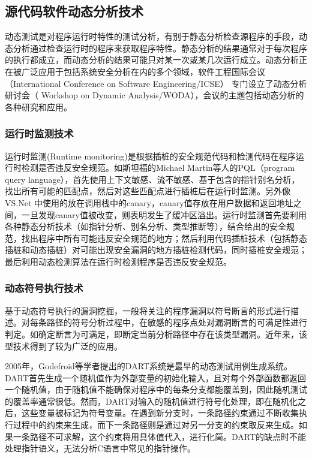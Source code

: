 \subsection{源代码软件动态分析技术}

动态测试是对程序运行时特性的测试分析，有别于静态分析检查源程序的手段，动态分析通过检查运行时的程序来获取程序特性。静态分析的结果通常对于每次程序的执行都成立，而动态分析的结果可能只对某一次或某几次运行成立。动态分析正在被广泛应用于包括系统安全分析在内的多个领域，软件工程国际会议（International Conference on Software Engineering/ICSE） 专门设立了动态分析研讨会（ Workshop on Dynamic Analysis/WODA），会议的主题包括动态分析的各种研究和应用。

\subsubsection{运行时监测技术}

运行时监测(Runtime monitoring)是根据插桩的安全规范代码和检测代码在程序运行时检测是否违反安全规范。如斯坦福的Michael Martin等人的PQL（program query language），首先使用上下文敏感、流不敏感、基于包含的指针别名分析，找出所有可能的匹配点，然后对这些匹配点进行插桩后在运行时监测。另外像VS.Net 中使用的放在调用栈中的canary，canary值存放在用户数据和返回地址之间，一旦发现canary值被改变，则表明发生了缓冲区溢出。运行时监测首先要利用各种静态分析技术（如指针分析、别名分析、类型推断等），结合给出的安全规范，找出程序中所有可能违反安全规范的地方；然后利用代码插桩技术（包括静态插桩和动态插桩）对可能出现安全漏洞的地方插桩检测代码，同时插桩安全规范；最后利用动态检测算法在运行时检测程序是否违反安全规范。

\subsubsection{动态符号执行技术}


基于动态符号执行的漏洞挖掘，一般将关注的程序漏洞以符号断言的形式进行描述。对每条路径的符号分析过程中，在敏感的程序点处对漏洞断言的可满足性进行判定。如确定断言为可满足，即断定当前分析路径中存在该类型漏洞。近年来，该型技术得到了较为广泛的应用。

2005年，Godefroid等学者提出的DART系统是最早的动态测试用例生成系统。DART首先生成一个随机值作为外部变量的初始化输入，且对每个外部函数都返回一个随机值，由于随机值不能确保对程序中的每条分支都能覆盖到，因此随机测试的覆盖率通常很低。然而，DART对输入的随机值进行符号化处理，即在随机化之后，这些变量被标记为符号变量。在遇到新分支时，一条路径约束通过不断收集执行过程中的约束来生成，而下一条路径则是通过对另一分支的约束取反来生成。如果一条路径不可求解，这个约束将用具体值代入，进行化简。DART的缺点时不能处理指针语义，无法分析C语言中常见的指针操作。

